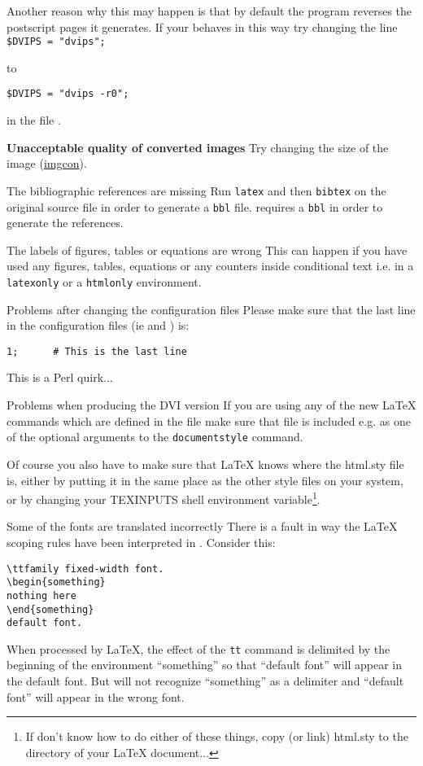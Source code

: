 \begin{htmllist}
Another reason why this may happen is that by default the  program
reverses the postscript pages it generates. If your 
behaves in this way try changing the line
\verb|$DVIPS = "dvips";| 

to

\verb|$DVIPS = "dvips -r0";|

in the file .

\item [\textbf{Unacceptable quality of converted images}]
Try changing the size of the image 
(\hyperref{See image conversion}{See Section }{}{imgcon}).

\item [The bibliographic references are missing]
Run \texttt{latex} and then \texttt{bibtex} on the original source file in
order to generate a \texttt{bbl} file. \latextohtml{} requires a \texttt{bbl}
in order to generate the references.

\item [The labels of figures, tables or equations are wrong]
This can happen if you have used any figures, tables, equations or
any counters inside conditional text i.e. in a \texttt{latexonly} 
or a \texttt{htmlonly} environment. 

\item [Problems after changing the configuration files]
Please make sure that the last line in the configuration files 
(ie  and ) is:
\begin{verbatim}
1;      # This is the last line
\end{verbatim}
This is a Perl quirk...

\item [Problems when producing the DVI version \label{htmlsty}]
If you are using any of the new LaTeX commands which are defined in 
the  file make sure that 
 file is included e.g. as one of the optional arguments to the 
\texttt{documentstyle} command.

Of course you also have to make sure that LaTeX knows where the html.sty
file is, either by putting it in the same place as the other style files on
your system, or by changing your TEXINPUTS shell environment variable\footnote{
If don't know how to do either of these things, copy (or link) html.sty 
to the directory of your LaTeX document...}.

\item [Some of the fonts are translated incorrectly]
There is a fault in way the LaTeX scoping rules have been 
interpreted in \latextohtml. Consider this:
\begin{verbatim}
\ttfamily fixed-width font.
\begin{something}
nothing here
\end{something}
default font.
\end{verbatim}
When processed by \LaTeX, the effect of the \texttt{tt} command is
delimited
by the beginning of the environment ``something'' so that ``default font'' will
appear in the default font. But \latextohtml{} will not recognize
``something'' as a delimiter and ``default font'' will appear in the
wrong
font. 


\end{htmllist}
